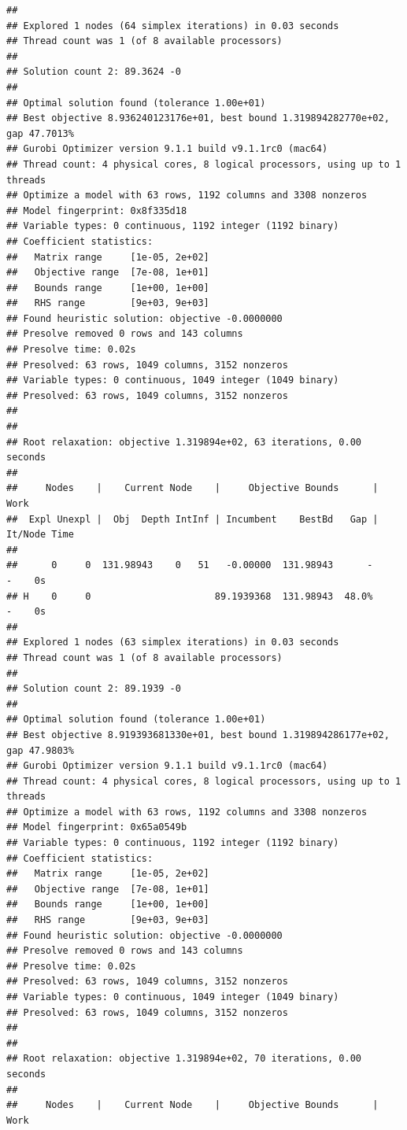 \documentclass[
  12pt,
]{book}
\begin{document}
\begin{verbatim}
## 
## Explored 1 nodes (64 simplex iterations) in 0.03 seconds
## Thread count was 1 (of 8 available processors)
## 
## Solution count 2: 89.3624 -0 
## 
## Optimal solution found (tolerance 1.00e+01)
## Best objective 8.936240123176e+01, best bound 1.319894282770e+02, gap 47.7013%
## Gurobi Optimizer version 9.1.1 build v9.1.1rc0 (mac64)
## Thread count: 4 physical cores, 8 logical processors, using up to 1 threads
## Optimize a model with 63 rows, 1192 columns and 3308 nonzeros
## Model fingerprint: 0x8f335d18
## Variable types: 0 continuous, 1192 integer (1192 binary)
## Coefficient statistics:
##   Matrix range     [1e-05, 2e+02]
##   Objective range  [7e-08, 1e+01]
##   Bounds range     [1e+00, 1e+00]
##   RHS range        [9e+03, 9e+03]
## Found heuristic solution: objective -0.0000000
## Presolve removed 0 rows and 143 columns
## Presolve time: 0.02s
## Presolved: 63 rows, 1049 columns, 3152 nonzeros
## Variable types: 0 continuous, 1049 integer (1049 binary)
## Presolved: 63 rows, 1049 columns, 3152 nonzeros
## 
## 
## Root relaxation: objective 1.319894e+02, 63 iterations, 0.00 seconds
## 
##     Nodes    |    Current Node    |     Objective Bounds      |     Work
##  Expl Unexpl |  Obj  Depth IntInf | Incumbent    BestBd   Gap | It/Node Time
## 
##      0     0  131.98943    0   51   -0.00000  131.98943      -     -    0s
## H    0     0                      89.1939368  131.98943  48.0%     -    0s
## 
## Explored 1 nodes (63 simplex iterations) in 0.03 seconds
## Thread count was 1 (of 8 available processors)
## 
## Solution count 2: 89.1939 -0 
## 
## Optimal solution found (tolerance 1.00e+01)
## Best objective 8.919393681330e+01, best bound 1.319894286177e+02, gap 47.9803%
## Gurobi Optimizer version 9.1.1 build v9.1.1rc0 (mac64)
## Thread count: 4 physical cores, 8 logical processors, using up to 1 threads
## Optimize a model with 63 rows, 1192 columns and 3308 nonzeros
## Model fingerprint: 0x65a0549b
## Variable types: 0 continuous, 1192 integer (1192 binary)
## Coefficient statistics:
##   Matrix range     [1e-05, 2e+02]
##   Objective range  [7e-08, 1e+01]
##   Bounds range     [1e+00, 1e+00]
##   RHS range        [9e+03, 9e+03]
## Found heuristic solution: objective -0.0000000
## Presolve removed 0 rows and 143 columns
## Presolve time: 0.02s
## Presolved: 63 rows, 1049 columns, 3152 nonzeros
## Variable types: 0 continuous, 1049 integer (1049 binary)
## Presolved: 63 rows, 1049 columns, 3152 nonzeros
## 
## 
## Root relaxation: objective 1.319894e+02, 70 iterations, 0.00 seconds
## 
##     Nodes    |    Current Node    |     Objective Bounds      |     Work

\end{verbatim}
\end{document}
